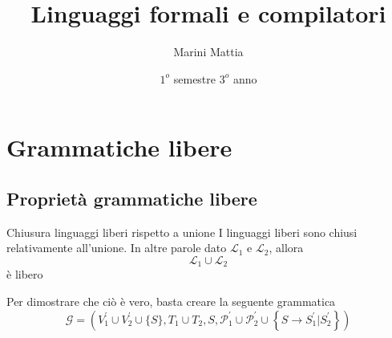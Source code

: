 \endofdump

\usetikzlibrary{external}
\usepackage{cancel}
\usepackage{contour}
\tikzexternalize[prefix=tikz/]

\newcommand{\inputGrammar}[1]{
	

	\begin{center}
		
	\end{center}

	\begin{table}[H]
		\begin{center}
			
		\end{center}
		\caption{Tabella LR(0) \textit{senza} pruning}
	\end{table}

	\begin{table}[H]
		\begin{center}
			
		\end{center}
		\caption{Tabella LR(0) \textit{con} pruning}
	\end{table}
}

\title{Linguaggi formali e compilatori}
\author{Marini Mattia}
\date{$ 1^o $ semestre $ 3^o $ anno}


\maketitle
\tableofcontents
\listofdefs
\listoftheorems
\newpage

\section{Grammatiche libere}
\subsection{Proprietà grammatiche libere}
\begin{teorema}{Chiusura linguaggi liberi rispetto a unione}\label{chiusura per unione}
	I linguaggi liberi sono chiusi relativamente all'unione. In altre parole dato $ \mathcal{L}_1 $ e $ \mathcal{L}_2 $, allora
	\[
		\mathcal{L}_1 \cup \mathcal{L}_2
	\]
	è libero
\end{teorema}
Per dimostrare che ciò è vero, basta creare la seguente grammatica
\[
	\mathcal{G}=\left(V_1^{\prime} \cup V_2^{\prime} \cup\{S\}, T_1 \cup T_2, S, \mathcal{P}_1^{\prime} \cup \mathcal{P}_2^{\prime} \cup\left\{S \rightarrow S_1^{\prime} | S_2^{\prime}\right\}\right)
\]

